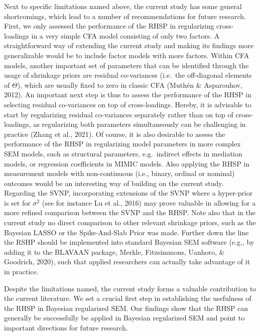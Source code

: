 \documentclass[
  man, donotrepeattitle,floatsintext]{apa6}
\begin{document}
Next to specific limitations named above, the current study has some general shortcomings, which lead to a number of recommendations for future research. First, we only assessed the performance of the RHSP in regularizing cross-loadings in a very simple CFA model consisting of only two factors. A straightforward way of extending the current study and making its findings more generalizable would be to include factor models with more factors. Within CFA models, another important set of parameters that can be identified through the usage of shrinkage priors are residual co-variances (i.e.~the off-diagonal elements of \(\Theta\)), which are usually fixed to zero in classic CFA (Muthén \& Asparouhov, 2012). An important next step is thus to assess the performance of the RHSP in selecting residual co-variances on top of cross-loadings. Hereby, it is advisable to start by regularizing residual co-variances separately rather than on top of cross-loadings, as regularizing both parameters simultaneously can be challenging in practice (Zhang et al., 2021). Of course, it is also desirable to assess the performance of the RHSP in regularizing model parameters in more complex SEM models, such as structural parameters, e.g.~indirect effects in mediation models, or regression coefficients in MIMIC models. Also applying the RHSP in measurement models with non-continuous (i.e., binary, ordinal or nominal) outcomes would be an interesting way of building on the current study. Regarding the SVNP, incorporating extensions of the SVNP where a hyper-prior is set for \(\sigma^2\) (see for instance Lu et al., 2016) may prove valuable in allowing for a more refined comparison between the SVNP and the RHSP. Note also that in the current study no direct comparison to other relevant shrinkage priors, such as the Bayesian LASSO or the Spike-And-Slab Prior was made. Further down the line the RSHP should be implemented into standard Bayesian SEM software (e.g., by adding it to the BLAVAAN package, Merkle, Fitzsimmons, Uanhoro, \& Goodrich, 2020), such that applied researchers can actually take advantage of it in practice.

Despite the limitations named, the current study forms a valuable contribution to the current literature. We set a crucial first step in establishing the usefulness of the RHSP in Bayesian regularized SEM. Our findings show that the RHSP can generally be successfully be applied in Bayesian regularized SEM and point to important directions for future research.

\clearpage
\end{document}
